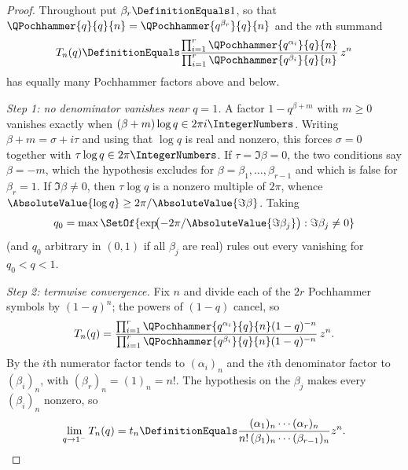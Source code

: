 \documentclass[11pt,a4paper,oneside,openany]{book}
\theoremstyle{definition}
\theoremstyle{remark}
\begin{document}

\begin{proof}
Throughout put $\beta_r\DefinitionEquals1$, so that $\QPochhammer{q}{q}{n}=\QPochhammer{q^{\beta_r}}{q}{n}$ and the $n$th summand
\[
 T_n(q)\DefinitionEquals
 \frac{\prod_{i=1}^{r}\QPochhammer{q^{\alpha_i}}{q}{n}}
      {\prod_{i=1}^{r}\QPochhammer{q^{\beta_i}}{q}{n}}\,z^n
\]
has equally many Pochhammer factors above and below.

\emph{Step 1: no denominator vanishes near $q=1$.}
A factor $1-q^{\beta+m}$ with $m\ge0$ vanishes exactly when $(\beta+m)\log q\in2\pi i\IntegerNumbers$.  Writing $\beta+m=\sigma+i\tau$ and using that $\log q$ is real and nonzero, this forces $\sigma=0$ together with $\tau\log q\in2\pi\IntegerNumbers$.  If $\tau=\Im\beta=0$, the two conditions say $\beta=-m$, which the hypothesis excludes for $\beta=\beta_1,\dots,\beta_{r-1}$ and which is false for $\beta_r=1$.  If $\Im\beta\ne0$, then $\tau\log q$ is a nonzero multiple of $2\pi$, whence $\AbsoluteValue{\log q}\ge2\pi/\AbsoluteValue{\Im\beta}$.  Taking
\[
 q_0=\max\SetOf{\exp\!\bigl(-2\pi/\AbsoluteValue{\Im\beta_j}\bigr):\Im\beta_j\ne0}
\]
(and $q_0$ arbitrary in $(0,1)$ if all $\beta_j$ are real) rules out every vanishing for $q_0<q<1$.

\emph{Step 2: termwise convergence.}
Fix $n$ and divide each of the $2r$ Pochhammer symbols by $(1-q)^n$; the powers of $(1-q)$ cancel, so
\[
 T_n(q)=
 \frac{\prod_{i=1}^{r}\QPochhammer{q^{\alpha_i}}{q}{n}(1-q)^{-n}}
      {\prod_{i=1}^{r}\QPochhammer{q^{\beta_i}}{q}{n}(1-q)^{-n}}\,z^n .
\]
By  the $i$th numerator factor tends to $(\alpha_i)_n$ and the $i$th denominator factor to $(\beta_i)_n$, with $(\beta_r)_n=(1)_n=n!$.  The hypothesis on the $\beta_j$ makes every $(\beta_i)_n$ nonzero, so
\[
 \lim_{q\to1^-}T_n(q)=t_n\DefinitionEquals
 \frac{(\alpha_1)_n\cdots(\alpha_r)_n}
      {n!\,(\beta_1)_n\cdots(\beta_{r-1})_n}z^n .
\]


\end{proof}
\end{document}
